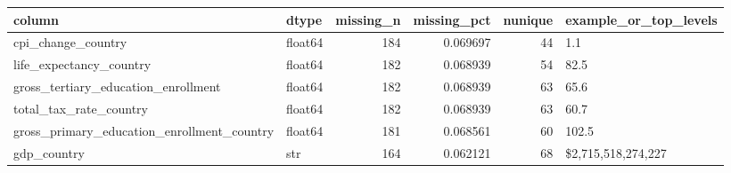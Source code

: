 \begin{tabular}{llrrrl}
\toprule
column & dtype & missing\_n & missing\_pct & nunique & example\_or\_top\_levels \\
\midrule
cpi\_change\_country & float64 & 184 & 0.069697 & 44 & 1.1 \\
life\_expectancy\_country & float64 & 182 & 0.068939 & 54 & 82.5 \\
gross\_tertiary\_education\_enrollment & float64 & 182 & 0.068939 & 63 & 65.6 \\
total\_tax\_rate\_country & float64 & 182 & 0.068939 & 63 & 60.7 \\
gross\_primary\_education\_enrollment\_country & float64 & 181 & 0.068561 & 60 & 102.5 \\
gdp\_country & str & 164 & 0.062121 & 68 & \$2,715,518,274,227  \\
\bottomrule
\end{tabular}
